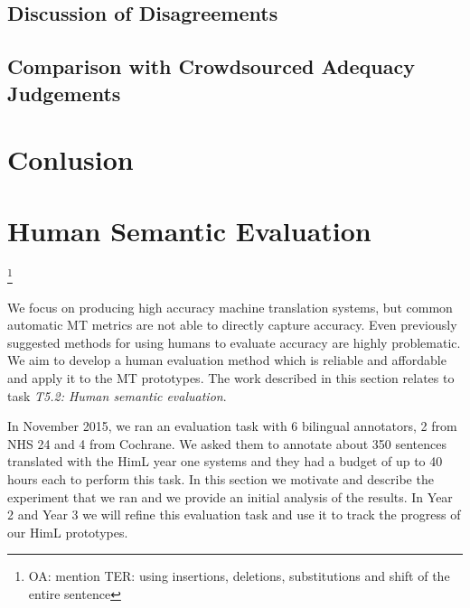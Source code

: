 \documentclass[11pt]{article}
\newcommand{\oa}[1]{\footnote{\color{red}OA: #1}}
\begin{document}
\subsection{Discussion of Disagreements}\label{sec:disagreements}


\subsection{Comparison with Crowdsourced Adequacy Judgements}\label{sec:adequacy}



\section{Conlusion}\label{sec:conclusion}










\section{Human Semantic Evaluation}

\oa{mention TER: using insertions, deletions, substitutions and shift of the entire sentence}

\label{sec:sem-eval:human}
We focus on producing high accuracy machine translation systems, but common 
automatic MT metrics are not able to directly capture accuracy. Even previously suggested methods
for using humans to evaluate accuracy are highly problematic. We aim to  develop a human evaluation method 
which is reliable and affordable and apply it to the MT prototypes. 
The
work described
in this section relates to 
task
\emph{T5.2: Human semantic evaluation}.


In November 2015, we ran an evaluation task with 6 bilingual annotators, 2 from NHS 24 and 4 from Cochrane. 
We asked them to annotate about 350 sentences translated with the HimL year one systems 
and they had a budget of  up  to 40 hours each to perform this task. 
In this section we motivate and describe the experiment that we ran and we provide an initial analysis of
the results. In  Year 2 and Year 3 we will refine this evaluation task and use it to track the progress of our HimL prototypes.
\end{document}
